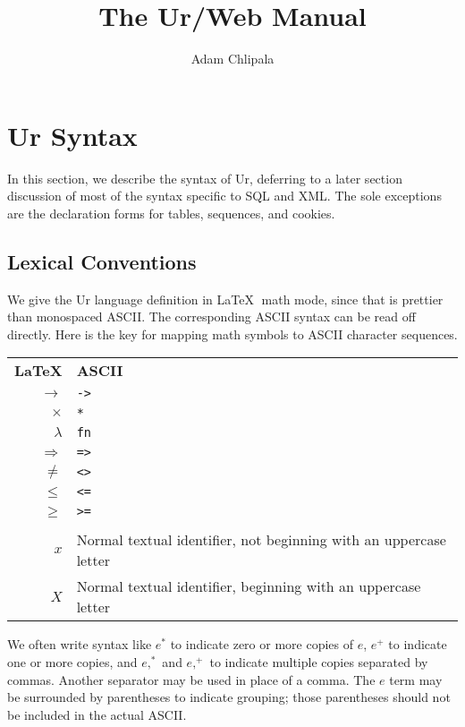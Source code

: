 \documentclass{article}
\newcommand{\cd}[1]{\texttt{#1}}
\begin{document}
\title{The Ur/Web Manual}
\author{Adam Chlipala}

\maketitle

\section{Ur Syntax}

In this section, we describe the syntax of Ur, deferring to a later section discussion of most of the syntax specific to SQL and XML.  The sole exceptions are the declaration forms for tables, sequences, and cookies.

\subsection{Lexical Conventions}

We give the Ur language definition in \LaTeX $\;$ math mode, since that is prettier than monospaced ASCII.  The corresponding ASCII syntax can be read off directly.  Here is the key for mapping math symbols to ASCII character sequences.

\begin{center}
  \begin{tabular}{rl}
    \textbf{\LaTeX} & \textbf{ASCII} \\
    $\to$ & \cd{->} \\
    $\times$ & \cd{*} \\
    $\lambda$ & \cd{fn} \\
    $\Rightarrow$ & \cd{=>} \\
    $\neq$ & \cd{<>} \\
    $\leq$ & \cd{<=} \\
    $\geq$ & \cd{>=} \\
    \\
    $x$ & Normal textual identifier, not beginning with an uppercase letter \\
    $X$ & Normal textual identifier, beginning with an uppercase letter \\
  \end{tabular}
\end{center}

We often write syntax like $e^*$ to indicate zero or more copies of $e$, $e^+$ to indicate one or more copies, and $e,^*$ and $e,^+$ to indicate multiple copies separated by commas.  Another separator may be used in place of a comma.  The $e$ term may be surrounded by parentheses to indicate grouping; those parentheses should not be included in the actual ASCII.
\end{document}
